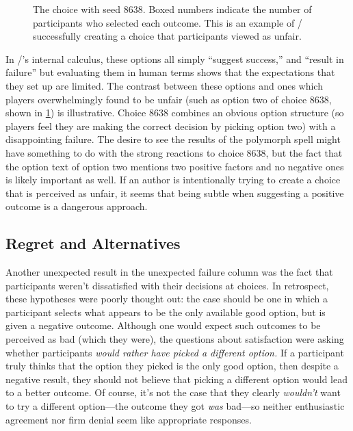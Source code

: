 \begin{figure}[!t]
\caption[``Obvious failure'' choice 8638]{The \obvf{} choice with seed 8638. Boxed numbers indicate the number of participants who selected each outcome. This is an example of \dunyazad/ successfully creating a choice that participants viewed as unfair.}
\label{fig:e2-seed-8638}
\end{figure}


In \dunyazad/'s internal calculus, these options all simply ``suggest success,'' and ``result in failure'' but evaluating them in human terms shows that the expectations that they set up are limited.
%
The contrast between these options and ones which players overwhelmingly found to be unfair (such as option two of choice 8638, shown in \cref{fig:e2-seed-8638}) is illustrative.
%
Choice 8638 combines an obvious option structure (so players feel they are making the correct decision by picking option two) with a disappointing failure.
%
The desire to see the results of the polymorph spell might have something to do with the strong reactions to choice 8638, but the fact that the option text of option two mentions two positive factors and no negative ones is likely important as well.
%
If an author is intentionally trying to create a choice that is perceived as unfair, it seems that being subtle when suggesting a positive outcome is a dangerous approach.


\subsection{Regret and Alternatives}
\label{sec:results-about-regret}

Another unexpected result in the unexpected failure column was the fact that participants weren't dissatisfied with their decisions at \obvf{} choices.
%
In retrospect, these hypotheses were poorly thought out: the \obvfm{} case should be one in which a participant selects what appears to be the only available good option, but is given a negative outcome.
%
Although one would expect such outcomes to be perceived as bad (which they were), the questions about satisfaction were asking whether participants \emph{would rather have picked a different option.}
%
If a participant truly thinks that the option they picked is the only good option, then despite a negative result, they should not believe that picking a different option would lead to a better outcome.
%
Of course, it's not the case that they clearly \emph{wouldn't} want to try a different option---the outcome they got \emph{was} bad---so neither enthusiastic agreement nor firm denial seem like appropriate responses.


